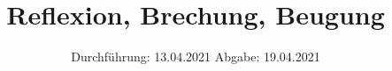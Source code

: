 

\subject{V400}
\title{Reflexion, Brechung, Beugung}
\date{%
  Durchführung: 13.04.2021
  \hspace{3em}
  Abgabe: 19.04.2021
}



\maketitle
\thispagestyle{empty}
\tableofcontents
\newpage







\printbibliography{}


